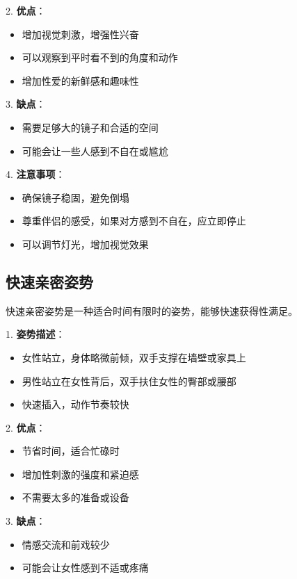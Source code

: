 \documentclass[12pt,UTF8]{ctexbook}
\begin{document}
2. \textbf{优点}：
  \begin{itemize}
  \item 增加视觉刺激，增强性兴奋
  \item 可以观察到平时看不到的角度和动作
  \item 增加性爱的新鲜感和趣味性
  \end{itemize}

3. \textbf{缺点}：
  \begin{itemize}
  \item 需要足够大的镜子和合适的空间
  \item 可能会让一些人感到不自在或尴尬
  \end{itemize}

4. \textbf{注意事项}：
  \begin{itemize}
  \item 确保镜子稳固，避免倒塌
  \item 尊重伴侣的感受，如果对方感到不自在，应立即停止
  \item 可以调节灯光，增加视觉效果
  \end{itemize}

\subsection{快速亲密姿势}

快速亲密姿势是一种适合时间有限时的姿势，能够快速获得性满足。

1. \textbf{姿势描述}：
  \begin{itemize}
  \item 女性站立，身体略微前倾，双手支撑在墙壁或家具上
  \item 男性站立在女性背后，双手扶住女性的臀部或腰部
  \item 快速插入，动作节奏较快
  \end{itemize}

2. \textbf{优点}：
  \begin{itemize}
  \item 节省时间，适合忙碌时
  \item 增加性刺激的强度和紧迫感
  \item 不需要太多的准备或设备
  \end{itemize}

3. \textbf{缺点}：
  \begin{itemize}
  \item 情感交流和前戏较少
  \item 可能会让女性感到不适或疼痛
  \end{itemize}
\end{document}
